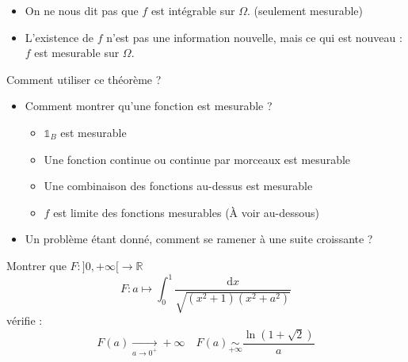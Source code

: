 \begin{note}{}{}
  \begin{itemize}

      \item 
On ne nous dit pas que $f$ est intégrable sur $\Omega$. (seulement mesurable)

\item 
L'existence de $f$ n'est pas une information nouvelle, mais ce qui est nouveau : $f$ est mesurable sur $\Omega$.

  \end{itemize}

\end{note}


\begin{note}{Comment utiliser ce théorème ?}{}

  \begin{itemize}

      \item Comment montrer qu'une fonction est mesurable ? 
        \begin{itemize}

            \item $\mathbb{1}_B$ est mesurable 
            \item Une fonction continue ou continue par morceaux est mesurable 
            \item Une combinaison des fonctions au-dessus est mesurable
            \item $f$ est limite des fonctions mesurables (À voir au-dessous)

        \end{itemize}
      \item Un problème étant donné, comment se ramener à une suite croissante ? 

  \end{itemize}
\end{note}


\begin{Example}{}{}
  Montrer que $F : ]0, +\infty[ \to \mathbb{R}$
  \begin{equation}
    F : a \mapsto \int_{0}^{1} \frac{\mathrm{d}x}{\sqrt{(x ^{2}+1)(x ^{2}+a ^{2})}} 
  \end{equation}
  vérifie : 
  \begin{equation}
    F(a)  \underset{a \to 0 ^{+}}{\longrightarrow}  + \infty \quad F(a)  \underset{+ \infty}{\sim} \frac{\ln(1+ \sqrt{2})}{a} 
  \end{equation}
\end{Example}

